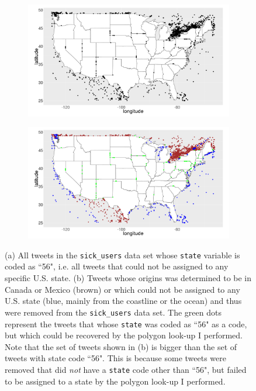 \documentclass[11pt, a4paper,twoside]{report}\usepackage[]{graphicx}\usepackage[]{color}
\begin{document}
\begin{figure}[htbp!]
  \centering
    \begin{subfigure}[t]{0.8\textwidth}
    \includegraphics[width=1\linewidth]{04_state56_sick_raw_df.png}
    \caption{}
  \end{subfigure}
  \begin{subfigure}[t]{0.8\textwidth}
  \includegraphics[width=1\linewidth]{05_CanexicoAndRemoved_sick_raw_df.png}
  \caption{}
  \end{subfigure}
  \caption{(a) All tweets in the \texttt{sick\_users} data set whose \texttt{state} variable is coded as ``56", i.e. all tweets that could not be assigned to any specific U.S. state. (b) Tweets whose origins was determined to be in Canada or Mexico (brown) or which could not be assigned to any U.S. state (blue, mainly from the coastline or the ocean) and thus were removed from the \texttt{sick\_users} data set. The green dots represent the tweets that whose \texttt{state} was coded as ``56" as  a code, but which could be recovered by the polygon look-up I performed. Note that the set of tweets shown in (b) is bigger than the set of tweets with state code ``56". This is because some tweets were removed that did \textit{not} have a \texttt{state} code other than ``56", but failed to be assigned to a state by the polygon look-up I performed.}
  \label{fig:canexico_and_removed}
  \end{figure}
\end{document}
